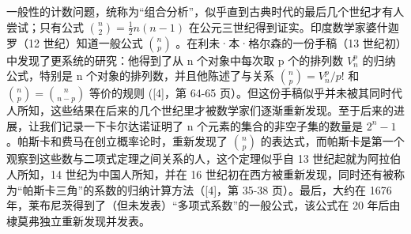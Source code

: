 一般性的计数问题，统称为“组合分析”，似乎直到古典时代的最后几个世纪才有人尝试；只有公式 \(\binom{n}{2} = \frac{1}{2} n(n - 1)\) 在公元三世纪得到证实。印度数学家婆什迦罗（12 世纪）知道一般公式 \(\binom{n}{p}\) 。在利未·本·格尔森的一份手稿（13 世纪初）中发现了更系统的研究：他得到了从 n 个对象中每次取 p 个的排列数 \(V_{n}^{p}\) 的归纳公式，特别是 n 个对象的排列数，并且他陈述了与关系 \(\binom{n}{p} = V_{n}^{p}/p!\) 和 \(\binom{n}{p} = \binom{n}{n-p}\) 等价的规则 ({[}4{]}，第 64-65 页）。但这份手稿似乎并未被其同时代人所知，这些结果在后来的几个世纪里才被数学家们逐渐重新发现。至于后来的进展，让我们记录一下卡尔达诺证明了 n 个元素的集合的非空子集的数量是 \(2^{n} - 1\) 。帕斯卡和费马在创立概率论时，重新发现了 \(\binom{n}{p}\) 的表达式，而帕斯卡是第一个观察到这些数与二项式定理之间关系的人，这个定理似乎自 13 世纪起就为阿拉伯人所知，14 世纪为中国人所知，并在 16 世纪初在西方被重新发现，同时还有被称为“帕斯卡三角”的系数的归纳计算方法（{[}4{]}，第 35-38 页）。最后，大约在 1676 年，莱布尼茨得到了（但未发表）“多项式系数”的一般公式，该公式在 20 年后由棣莫弗独立重新发现并发表。

